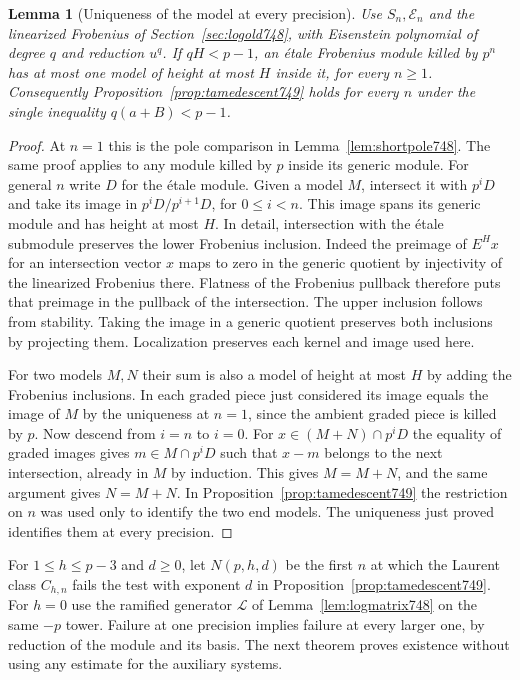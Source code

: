 \documentclass[a4paper,11pt]{article}
\newtheorem{lemma}[proposition]{Lemma}
\theoremstyle{definition}
\theoremstyle{remark}
\numberwithin{equation}{section}
\begin{document}
\begin{lemma}[Uniqueness of the model at every precision]
\leavevmode\label{lem:allmodels750}
Use \(S_n,\mathcal E_n\) and the linearized Frobenius of
Section~\ref{sec:logold748}, with Eisenstein polynomial of degree
\(q\) and reduction \(u^q\). If \(qH<p-1\), an \'etale
Frobenius module killed by \(p^n\) has at most one model of
height at most \(H\) inside it, for every \(n\ge1\).
Consequently Proposition~\ref{prop:tamedescent749} holds for
every \(n\) under the single inequality \(q(a+B)<p-1\).
\end{lemma}
\begin{proof}
At \(n=1\) this is the pole comparison in
Lemma~\ref{lem:shortpole748}. The same proof applies to any
module killed by \(p\) inside its generic module. For general
\(n\) write \(D\) for the \'etale module. Given a model \(M\),
intersect it with \(p^iD\) and take its image in
\(p^iD/p^{i+1}D\), for \(0\le i<n\). This image spans its
generic module and has height at most \(H\). In detail,
intersection with the \'etale submodule preserves the lower
Frobenius inclusion. Indeed the preimage of \(E^H x\) for an
intersection vector \(x\) maps to zero in the generic quotient
by injectivity of the linearized Frobenius there. Flatness of
the Frobenius pullback therefore puts that preimage in the
pullback of the intersection. The upper inclusion follows from
stability. Taking the image in a generic quotient preserves
both inclusions by projecting them. Localization preserves
each kernel and image used here.

For two models \(M,N\) their sum is also a model of height
at most \(H\) by adding the Frobenius inclusions. In each
graded piece just considered its image equals the image of
\(M\) by the uniqueness at \(n=1\), since the ambient graded
piece is killed by \(p\). Now descend from \(i=n\) to \(i=0\).
For \(x\in(M+N)\cap p^iD\) the equality of graded images
gives \(m\in M\cap p^iD\) such that \(x-m\) belongs to the
next intersection, already in \(M\) by induction.
This gives \(M=M+N\), and the same argument gives \(N=M+N\).
In Proposition~\ref{prop:tamedescent749} the restriction on
\(n\) was used only to identify the two end models. The
uniqueness just proved identifies them at every precision.
\end{proof}

For \(1\le h\le p-3\) and \(d\ge0\), let \(N(p,h,d)\) be the
first \(n\) at which the Laurent class \(C_{h,n}\) fails the
test with exponent \(d\) in Proposition~\ref{prop:tamedescent749}.
For \(h=0\) use the ramified generator \(\mathcal L\) of
Lemma~\ref{lem:logmatrix748} on the same \(-p\) tower.
Failure at one precision implies failure at every larger one,
by reduction of the module and its basis. The next theorem proves
existence without using any estimate for the auxiliary systems.
\end{document}
